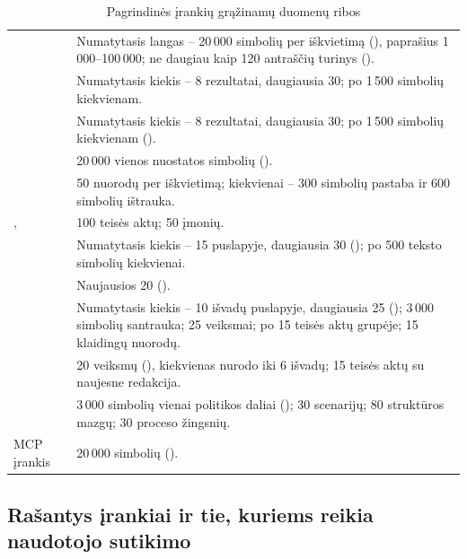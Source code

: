 \begin{table}[H]
\caption{Pagrindinės įrankių grąžinamų duomenų ribos}\label{tab:chat:caps}
\begin{tabularx}{\textwidth}{@{}L{40mm}Y@{}}
\toprule
{} &  \\
\midrule
{} & Numatytasis langas -- 20\,000 simbolių per iškvietimą (), paprašius 1\,000--100\,000; ne daugiau kaip 120 antraščių turinys (). \\
 & Numatytasis kiekis -- 8 rezultatai, daugiausia 30; po 1\,500 simbolių kiekvienam. \\
 & Numatytasis kiekis -- 8 rezultatai, daugiausia 30; po 1\,500 simbolių kiekvienam (). \\
 & 20\,000 vienos nuostatos simbolių (). \\
 & 50 nuorodų per iškvietimą; kiekvienai -- 300 simbolių pastaba ir 600 simbolių ištrauka. \\
,  & 100 teisės aktų; 50 įmonių. \\
 & Numatytasis kiekis -- 15 puslapyje, daugiausia 30 (); po 500 teksto simbolių kiekvienai. \\
 & Naujausios 20 (). \\
 & Numatytasis kiekis -- 10 išvadų puslapyje, daugiausia 25 (); 3\,000 simbolių santrauka; 25 veiksmai; po 15 teisės aktų grupėje; 15 klaidingų nuorodų. \\
 & 20 veiksmų (), kiekvienas nurodo iki 6 išvadų; 15 teisės aktų su naujesne redakcija. \\
 & 3\,000 simbolių vienai politikos daliai (); 30 scenarijų; 80 struktūros mazgų; 30 proceso žingsnių. \\
MCP įrankis & 20\,000 simbolių (). \\
\bottomrule
\end{tabularx}
\end{table}

\subsection{Rašantys įrankiai ir tie, kuriems reikia naudotojo sutikimo}\label{sec:chat:gates}

